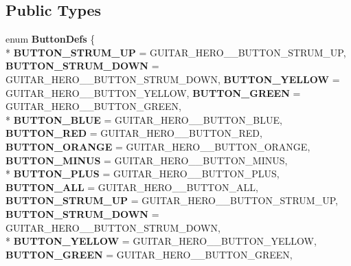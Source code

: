 \subsection*{Public Types}
\begin{DoxyCompactItemize}
\item 
enum {\bfseries Button\-Defs} \{ \\*
{\bfseries B\-U\-T\-T\-O\-N\-\_\-\-S\-T\-R\-U\-M\-\_\-\-U\-P} =  G\-U\-I\-T\-A\-R\-\_\-\-H\-E\-R\-O\-\_\-\_\-\-B\-U\-T\-T\-O\-N\-\_\-\-S\-T\-R\-U\-M\-\_\-\-U\-P, 
{\bfseries B\-U\-T\-T\-O\-N\-\_\-\-S\-T\-R\-U\-M\-\_\-\-D\-O\-W\-N} =  G\-U\-I\-T\-A\-R\-\_\-\-H\-E\-R\-O\-\_\-\_\-\-B\-U\-T\-T\-O\-N\-\_\-\-S\-T\-R\-U\-M\-\_\-\-D\-O\-W\-N, 
{\bfseries B\-U\-T\-T\-O\-N\-\_\-\-Y\-E\-L\-L\-O\-W} =  G\-U\-I\-T\-A\-R\-\_\-\-H\-E\-R\-O\-\_\-\_\-\-B\-U\-T\-T\-O\-N\-\_\-\-Y\-E\-L\-L\-O\-W, 
{\bfseries B\-U\-T\-T\-O\-N\-\_\-\-G\-R\-E\-E\-N} =  G\-U\-I\-T\-A\-R\-\_\-\-H\-E\-R\-O\-\_\-\_\-\-B\-U\-T\-T\-O\-N\-\_\-\-G\-R\-E\-E\-N, 
\\*
{\bfseries B\-U\-T\-T\-O\-N\-\_\-\-B\-L\-U\-E} =  G\-U\-I\-T\-A\-R\-\_\-\-H\-E\-R\-O\-\_\-\_\-\-B\-U\-T\-T\-O\-N\-\_\-\-B\-L\-U\-E, 
{\bfseries B\-U\-T\-T\-O\-N\-\_\-\-R\-E\-D} =  G\-U\-I\-T\-A\-R\-\_\-\-H\-E\-R\-O\-\_\-\_\-\-B\-U\-T\-T\-O\-N\-\_\-\-R\-E\-D, 
{\bfseries B\-U\-T\-T\-O\-N\-\_\-\-O\-R\-A\-N\-G\-E} =  G\-U\-I\-T\-A\-R\-\_\-\-H\-E\-R\-O\-\_\-\_\-\-B\-U\-T\-T\-O\-N\-\_\-\-O\-R\-A\-N\-G\-E, 
{\bfseries B\-U\-T\-T\-O\-N\-\_\-\-M\-I\-N\-U\-S} =  G\-U\-I\-T\-A\-R\-\_\-\-H\-E\-R\-O\-\_\-\_\-\-B\-U\-T\-T\-O\-N\-\_\-\-M\-I\-N\-U\-S, 
\\*
{\bfseries B\-U\-T\-T\-O\-N\-\_\-\-P\-L\-U\-S} =  G\-U\-I\-T\-A\-R\-\_\-\-H\-E\-R\-O\-\_\-\_\-\-B\-U\-T\-T\-O\-N\-\_\-\-P\-L\-U\-S, 
{\bfseries B\-U\-T\-T\-O\-N\-\_\-\-A\-L\-L} =  G\-U\-I\-T\-A\-R\-\_\-\-H\-E\-R\-O\-\_\-\_\-\-B\-U\-T\-T\-O\-N\-\_\-\-A\-L\-L, 
{\bfseries B\-U\-T\-T\-O\-N\-\_\-\-S\-T\-R\-U\-M\-\_\-\-U\-P} =  G\-U\-I\-T\-A\-R\-\_\-\-H\-E\-R\-O\-\_\-\_\-\-B\-U\-T\-T\-O\-N\-\_\-\-S\-T\-R\-U\-M\-\_\-\-U\-P, 
{\bfseries B\-U\-T\-T\-O\-N\-\_\-\-S\-T\-R\-U\-M\-\_\-\-D\-O\-W\-N} =  G\-U\-I\-T\-A\-R\-\_\-\-H\-E\-R\-O\-\_\-\_\-\-B\-U\-T\-T\-O\-N\-\_\-\-S\-T\-R\-U\-M\-\_\-\-D\-O\-W\-N, 
\\*
{\bfseries B\-U\-T\-T\-O\-N\-\_\-\-Y\-E\-L\-L\-O\-W} =  G\-U\-I\-T\-A\-R\-\_\-\-H\-E\-R\-O\-\_\-\_\-\-B\-U\-T\-T\-O\-N\-\_\-\-Y\-E\-L\-L\-O\-W, 
{\bfseries B\-U\-T\-T\-O\-N\-\_\-\-G\-R\-E\-E\-N} =  G\-U\-I\-T\-A\-R\-\_\-\-H\-E\-R\-O\-\_\-\_\-\-B\-U\-T\-T\-O\-N\-\_\-\-G\-R\-E\-E\-N, 

\end{DoxyCompactItemize}
